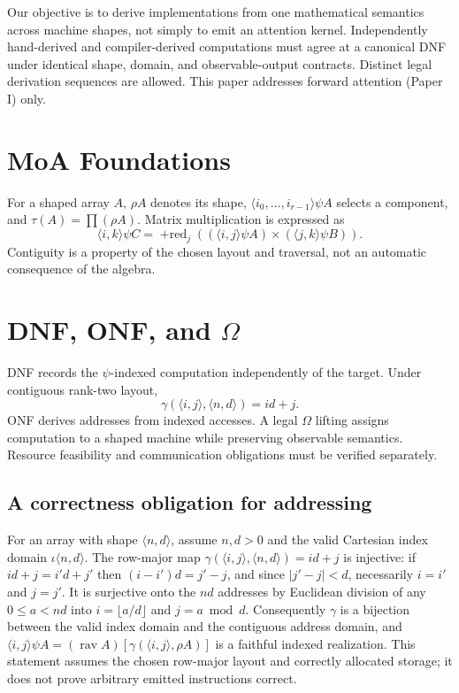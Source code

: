\documentclass[sigplan,10pt,review,anonymous]{acmart}
\begin{document}
Our objective is to derive implementations from one mathematical semantics across machine shapes, not simply to emit an attention kernel. Independently hand-derived and compiler-derived computations must agree at a canonical DNF under identical shape, domain, and observable-output contracts. Distinct legal derivation sequences are allowed. This paper addresses forward attention (Paper I) only.
\section{MoA Foundations}
For a shaped array $A$, $\rho A$ denotes its shape, $\langle i_0,\ldots,i_{r-1}\rangle\psi A$ selects a component, and $\tau(A)=\prod(\rho A)$. Matrix multiplication is expressed as
\[
\langle i,k\rangle\psi C=\mathop{+red}\nolimits_j((\langle i,j\rangle\psi A)\times(\langle j,k\rangle\psi B)).
\]
Contiguity is a property of the chosen layout and traversal, not an automatic consequence of the algebra.
\section{DNF, ONF, and $\Omega$}
DNF records the $\psi$-indexed computation independently of the target. Under contiguous rank-two layout,
\[
\gamma(\langle i,j\rangle,\langle n,d\rangle)=id+j.
\]
ONF derives addresses from indexed accesses. A legal $\Omega$ lifting assigns computation to a shaped machine while preserving observable semantics. Resource feasibility and communication obligations must be verified separately.
\subsection{A correctness obligation for addressing}
For an array with shape $\langle n,d\rangle$, assume $n,d>0$ and the valid Cartesian index domain $\iota\langle n,d\rangle$. The row-major map $\gamma(\langle i,j\rangle,\langle n,d\rangle)=id+j$ is injective: if $id+j=i'd+j'$ then $(i-i')d=j'-j$, and since $|j'-j|<d$, necessarily $i=i'$ and $j=j'$. It is surjective onto the $nd$ addresses by Euclidean division of any $0\le a<nd$ into $i=\lfloor a/d\rfloor$ and $j=a\bmod d$. Consequently $\gamma$ is a bijection between the valid index domain and the contiguous address domain, and $\langle i,j\rangle\psi A=(\operatorname{rav} A)[\gamma(\langle i,j\rangle,\rho A)]$ is a faithful indexed realization. This statement assumes the chosen row-major layout and correctly allocated storage; it does not prove arbitrary emitted instructions correct.
\end{document}
